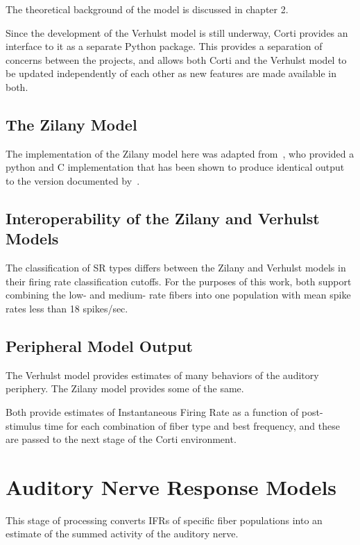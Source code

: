 The theoretical background of the model is discussed in chapter 2.

Since the development of the Verhulst model is still underway, Corti provides an interface to it as a separate Python package.  This provides a separation of concerns between the projects, and allows both Corti and the Verhulst model to be updated independently of each other as new features are made available in both. 
\subsection{The Zilany Model} %
\label{sub:the_zilany_model}
The implementation of the Zilany model here was adapted from~\cite{Rudnicki2014Cochlea}, who provided a python and C implementation that has been shown to produce identical output to the version documented by~\cite{Zilany2014Updated}. 

\subsection{Interoperability of the Zilany and Verhulst Models} %
\label{sub:interoperability_of_the_zilany_and_verhulst_models}
The classification of SR types differs between the Zilany and Verhulst models in their firing rate classification cutoffs.  For the purposes of this work, both support combining the low- and medium- rate fibers into one population with mean spike rates less than 18 spikes/sec.  



\subsection{Peripheral Model Output} %
\label{sub:peripheral_model_output}
The Verhulst model provides estimates of many behaviors of the auditory periphery.  The Zilany model provides some of the same. 

Both provide estimates of Instantaneous Firing Rate as a function of post-stimulus time for each combination of fiber type and best frequency, and these are passed to the next stage of the Corti environment.


\section{Auditory Nerve Response Models} %
\label{sec:auditory_nerve_response_models}
This stage of processing converts IFRs of specific fiber populations into an estimate of the summed activity of the auditory nerve. 

